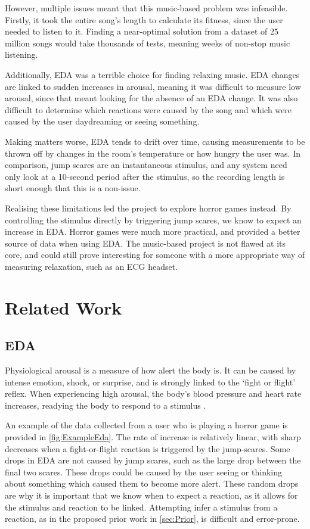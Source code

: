 \documentclass[12pt,a4paper]{article}\usepackage[]{graphicx}\usepackage[]{color}
\begin{document}
However, multiple issues meant that this music-based problem was infeasible.
Firstly, it took the entire song's length to calculate its fitness, since the user needed to listen to it.
Finding a near-optimal solution from a dataset of 25 million songs would take thousands of tests, meaning weeks of non-stop music listening.

Additionally, EDA was a terrible choice for finding relaxing music.
EDA changes are linked to sudden increases in arousal, meaning it was difficult to measure low arousal, since that meant looking for the absence of an EDA change.
It was also difficult to determine which reactions were caused by the song and which were caused by the user daydreaming or seeing something.

Making matters worse, EDA tends to drift over time, causing measurements to be thrown off by changes in the room's temperature or how hungry the user was.
In comparison, jump scares are an instantaneous stimulus, and any system need only look at a 10-second period after the stimulus, so the recording length is short enough that this is a non-issue.

Realising these limitations led the project to explore horror games instead.
By controlling the stimulus directly by triggering jump scares, we know to expect an increase in EDA.
Horror games were much more practical, and provided a better source of data when using EDA.
The music-based project is not flawed at its core, and could still prove interesting for someone with a more appropriate way of measuring relaxation, such as an ECG headset.

\section{Related Work}


\subsection{EDA}
Physiological arousal is a measure of how alert the body is.
It can be caused by intense emotion, shock, or surprise, and is strongly linked to the `fight or flight' reflex.
When experiencing high arousal, the body's blood pressure and heart rate increases, readying the body to respond to a stimulus \citep[pp. 162--167]{arousal}.

An example of the data collected from a user who is playing a horror game is provided in \vref{fig:ExampleEda}.
The rate of increase is relatively linear, with sharp decreases when a fight-or-flight reaction is triggered by the jump-scares.
Some drops in EDA are not caused by jump scares, such as the large drop between the final two scares.
These drops could be caused by the user seeing or thinking about something which caused them to become more alert.
These random drops are why it is important that we know when to expect a reaction, as it allows for the stimulus and reaction to be linked.
Attempting infer a stimulus from a reaction, as in the proposed prior work in \vref{sec:Prior}, is difficult and error-prone.
\end{document}
